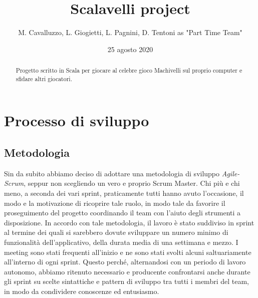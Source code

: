 \documentclass[a4paper,10pt]{article}
\title{Scalavelli project}
\date{25 agosto 2020}
\author{M. Cavalluzzo, L. Giogietti, L. Pagnini, D. Tentoni as "Part Time Team"}
\begin{document}
    \maketitle
    \newpage

    \begin{abstract}
        Progetto scritto in Scala per giocare al celebre gioco Machivelli sul proprio computer e sfidare altri giocatori.
    \end{abstract}

    \tableofcontents

    \newpage


    \section{Processo di sviluppo}

    \subsection{Metodologia}

    Sin da subito abbiamo deciso di adottare una metodologia di sviluppo \textit{Agile-Scrum}, seppur non scegliendo un
    vero e proprio Scrum Master. Chi più e chi meno, a seconda dei vari sprint, praticamente tutti hanno avuto
    l'occasione, il modo e la motivazione di ricoprire tale ruolo, in modo tale da favorire il proseguimento del
    progetto coordinando il team con l'aiuto degli strumenti a disposizione. %
    In accordo con tale metodologia, il lavoro è stato suddiviso in sprint al termine dei quali si sarebbero dovute
    sviluppare un numero minimo di funzionalità dell'applicativo, della durata media di una settimana e mezzo. I meeting
    sono stati frequenti all'inizio e ne sono stati svolti alcuni saltuariamente all'interno di ogni sprint. Questo
    perché, alternandosi con un periodo di lavoro autonomo, abbiamo ritenuto necessario e producente confrontarsi anche
    durante gli sprint su scelte sintattiche e pattern di sviluppo tra tutti i membri del team, in modo da condividere
    conoscenze ed entusiasmo.
\end{document}
